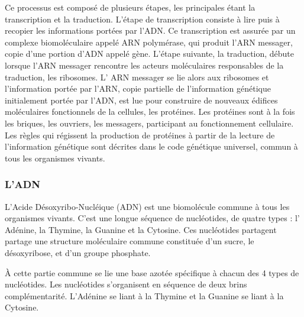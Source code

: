 Ce processus est composé de plusieurs étapes, les principales étant la transcription et la traduction. L'étape de transcription consiste à lire puis à recopier les informations portées par l'ADN. Ce transcription est assurée par un complexe biomoléculaire appelé ARN polymérase, qui produit l'ARN messager, copie d'une portion d'ADN appelé gène. L'étape suivante, la traduction, débute lorsque l'ARN messager rencontre les acteurs moléculaires responsables de la traduction, les ribosomes. L' ARN  messager se lie alors aux ribosomes et l'information portée par l'ARN, copie partielle de l'information génétique initialement portée par l'ADN, est lue pour construire de nouveaux édifices moléculaires fonctionnels de la cellules, les protéines. Les protéines sont à la fois les briques, les ouvriers, les messagers, participant au fonctionnement cellulaire. Les règles qui régissent la production de protéines à partir de la lecture de l'information génétique sont décrites dans le code génétique universel, commun à tous les organismes vivants. 



\subsubsection{L'ADN}

L'Acide Désoxyribo-Nucléique (ADN) est une biomolécule commune à tous les organismes vivants. C'est une longue séquence de nucléotides, de quatre types : l' Adénine, la Thymine, la Guanine et la Cytosine. Ces nucléotides partagent partage une structure moléculaire commune constituée d'un sucre, le désoxyribose, et d'un groupe phosphate. 



À cette partie commune se lie une base azotée spécifique à chacun des 4 types de nucléotides. Les nucléotides s'organisent en séquence de deux brins complémentarité. L'Adénine se liant à la Thymine et la Guanine se liant à la Cytosine. 

